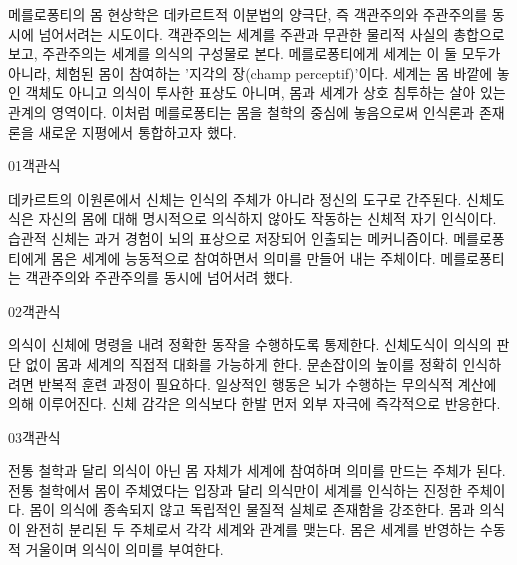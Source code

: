 \documentclass[fs85,seriesWit]{korfarm-base}
\begin{document}
{메를로퐁티의 몸 현상학은 데카르트적 이분법의 양극단, 즉 객관주의와 주관주의를 동시에 넘어서려는 시도이다. 객관주의는 세계를 주관과 무관한 물리적 사실의 총합으로 보고, 주관주의는 세계를 의식의 구성물로 본다. 메를로퐁티에게 세계는 이 둘 모두가 아니라, 체험된 몸이 참여하는 '지각의 장(champ perceptif)'이다. 세계는 몸 바깥에 놓인 객체도 아니고 의식이 투사한 표상도 아니며, 몸과 세계가 상호 침투하는 살아 있는 관계의 영역이다. 이처럼 메를로퐁티는 몸을 철학의 중심에 놓음으로써 인식론과 존재론을 새로운 지평에서 통합하고자 했다.
}\kfResetAreaFlag
{}

\kfBeginMC
\begin{kfQBlock}{01}{객관식}
\begin{kfChoices}
\kfChoice 데카르트의 이원론에서 신체는 인식의 주체가 아니라 정신의 도구로 간주된다.
\kfChoice 신체도식은 자신의 몸에 대해 명시적으로 의식하지 않아도 작동하는 신체적 자기 인식이다.
\kfChoice 습관적 신체는 과거 경험이 뇌의 표상으로 저장되어 인출되는 메커니즘이다.
\kfChoice 메를로퐁티에게 몸은 세계에 능동적으로 참여하면서 의미를 만들어 내는 주체이다.
\kfChoice 메를로퐁티는 객관주의와 주관주의를 동시에 넘어서려 했다.
\end{kfChoices}
\end{kfQBlock}

\begin{kfQBlock}{02}{객관식}
\begin{kfChoices}
\kfChoice 의식이 신체에 명령을 내려 정확한 동작을 수행하도록 통제한다.
\kfChoice 신체도식이 의식의 판단 없이 몸과 세계의 직접적 대화를 가능하게 한다.
\kfChoice 문손잡이의 높이를 정확히 인식하려면 반복적 훈련 과정이 필요하다.
\kfChoice 일상적인 행동은 뇌가 수행하는 무의식적 계산에 의해 이루어진다.
\kfChoice 신체 감각은 의식보다 한발 먼저 외부 자극에 즉각적으로 반응한다.
\end{kfChoices}
\end{kfQBlock}

\begin{kfQBlock}{03}{객관식}
\begin{kfChoices}
\kfChoice 전통 철학과 달리 의식이 아닌 몸 자체가 세계에 참여하며 의미를 만드는 주체가 된다.
\kfChoice 전통 철학에서 몸이 주체였다는 입장과 달리 의식만이 세계를 인식하는 진정한 주체이다.
\kfChoice 몸이 의식에 종속되지 않고 독립적인 물질적 실체로 존재함을 강조한다.
\kfChoice 몸과 의식이 완전히 분리된 두 주체로서 각각 세계와 관계를 맺는다.
\kfChoice 몸은 세계를 반영하는 수동적 거울이며 의식이 의미를 부여한다.
\end{kfChoices}
\end{kfQBlock}
\end{document}
